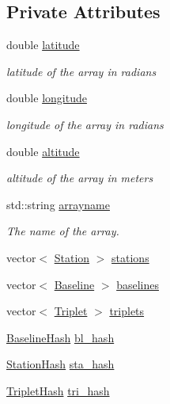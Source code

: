\subsection*{Private Attributes}
\begin{DoxyCompactItemize}
\item 
double \hyperlink{classArray_a3d0a097d6c7d27ab0ba7b72a9b2223e1}{latitude}
\begin{DoxyCompactList}\small\item\em latitude of the array in radians \item\end{DoxyCompactList}\item 
double \hyperlink{classArray_a7b0af12d6151bd9bb25e91145b79fb74}{longitude}
\begin{DoxyCompactList}\small\item\em longitude of the array in radians \item\end{DoxyCompactList}\item 
double \hyperlink{classArray_a07662f84d93f59a30c9312b6b546ee39}{altitude}
\begin{DoxyCompactList}\small\item\em altitude of the array in meters \item\end{DoxyCompactList}\item 
std::string \hyperlink{classArray_a12eb22fefdce3d4ae71d0340717c293a}{arrayname}
\begin{DoxyCompactList}\small\item\em The name of the array. \item\end{DoxyCompactList}\item 
vector$<$ \hyperlink{classStation}{Station} $>$ \hyperlink{classArray_a8dc3e704ff95584d28adbcedf1774b8b}{stations}
\item 
vector$<$ \hyperlink{classBaseline}{Baseline} $>$ \hyperlink{classArray_af43b2ed14c631c015a47b7e453ceec6d}{baselines}
\item 
vector$<$ \hyperlink{classTriplet}{Triplet} $>$ \hyperlink{classArray_aebc67b133d4e00adee3fc6afb3e2a873}{triplets}
\item 
\hyperlink{Baseline_8h_a13fb9639629482b090805e3ce005f7d8}{BaselineHash} \hyperlink{classArray_a288cf9eaad2011bd6ea76acbb08ed1ed}{bl\_\-hash}
\item 
\hyperlink{Station_8h_a079731e89ec4300689029a9276f15ef4}{StationHash} \hyperlink{classArray_ad832ad5752132c3a290989998c3561c1}{sta\_\-hash}
\item 
\hyperlink{Triplet_8h_a215e2423c5ccf6d7c50c76952f966b1e}{TripletHash} \hyperlink{classArray_ab2a4d4becfb20178cf01e1fd885195c6}{tri\_\-hash}
\end{DoxyCompactItemize}


